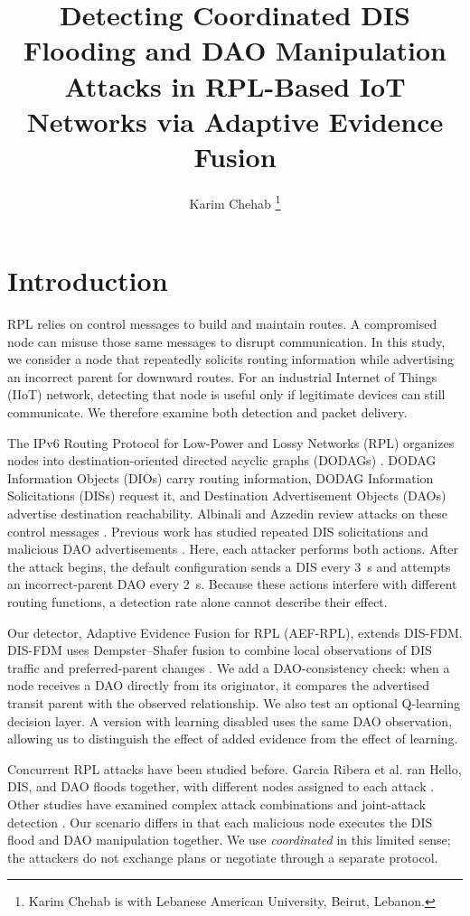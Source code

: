 \documentclass[journal]{IEEEtran}
\title{Detecting Coordinated DIS Flooding and DAO Manipulation Attacks in RPL-Based IoT Networks via Adaptive Evidence Fusion}
\author{Karim Chehab%
\thanks{Karim Chehab is with Lebanese American University, Beirut, Lebanon.}}
\date{}
\begin{document}
\maketitle

\section{Introduction}\label{sec:introduction}
RPL relies on control messages to build and maintain routes. A compromised node can misuse those same messages to disrupt communication. In this study, we consider a node that repeatedly solicits routing information while advertising an incorrect parent for downward routes. For an industrial Internet of Things (IIoT) network, detecting that node is useful only if legitimate devices can still communicate. We therefore examine both detection and packet delivery.

The IPv6 Routing Protocol for Low-Power and Lossy Networks (RPL) organizes nodes into destination-oriented directed acyclic graphs (DODAGs) \cite{rfc6550}. DODAG Information Objects (DIOs) carry routing information, DODAG Information Solicitations (DISs) request it, and Destination Advertisement Objects (DAOs) advertise destination reachability. Albinali and Azzedin review attacks on these control messages \cite{albinali2024}. Previous work has studied repeated DIS solicitations \cite{rajasekar2022,vermaranga2020,medjek2021} and malicious DAO advertisements \cite{pu2018,limsd2024}. Here, each attacker performs both actions. After the attack begins, the default configuration sends a DIS every 3~s and attempts an incorrect-parent DAO every 2~s. Because these actions interfere with different routing functions, a detection rate alone cannot describe their effect.

Our detector, Adaptive Evidence Fusion for RPL (AEF-RPL), extends DIS-FDM. DIS-FDM uses Dempster--Shafer fusion to combine local observations of DIS traffic and preferred-parent changes \cite{prajisha2025}. We add a DAO-consistency check: when a node receives a DAO directly from its originator, it compares the advertised transit parent with the observed relationship. We also test an optional Q-learning decision layer. A version with learning disabled uses the same DAO observation, allowing us to distinguish the effect of added evidence from the effect of learning.

Concurrent RPL attacks have been studied before. Garcia Ribera et al. ran Hello, DIS, and DAO floods together, with different nodes assigned to each attack \cite{garciaribera2022}. Other studies have examined complex attack combinations and joint-attack detection \cite{alsukayti2023,de2rarpl2024,abdulkareem2024}. Our scenario differs in that each malicious node executes the DIS flood and DAO manipulation together. We use \emph{coordinated} in this limited sense; the attackers do not exchange plans or negotiate through a separate protocol.
\end{document}
